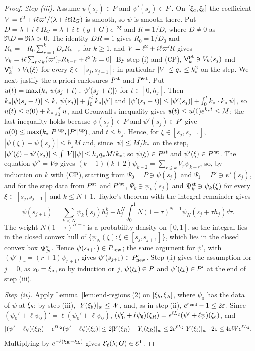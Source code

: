 \begin{proof}
\emph{Step \textup{(iii)}.} Assume $\psi(s_j)\in P$ and $\psi'(s_j)\in P'$. On
$[\xi_a,\xi_b]$ the coefficient $V=\ell^2+i\ell\varpi'/(\lambda+i\ell\Omega_G)$ is smooth, so
$\psi$ is smooth there. Put $D=\lambda+i\ell\Omega_G=\lambda+i\ell(g+G)e^{-2\xi}$ and
$R=1/D$, where $D\ne0$ as $\Re D=\Re\lambda>0$. The identity $DR=1$ gives
$R_0=1/D_0$ and $R_k=-R_0\sum_{r=1}^kD_rR_{k-r}$ for $k\ge1$, and
$V=\ell^2+i\ell\varpi'R$ gives $V_k=i\ell\sum_{r\le k}(\varpi')_rR_{k-r}+\ell^2[k=0]$. By
step (i) and (CP), $\mathsf V^{\rm pt}_k\ni V_k(s_j)$ and
$\mathsf V^{\rm st}_k\ni V_k(\xi)$ for every $\xi\in[s_j,s_{j+1}]$; in particular
$|V|\le q_*\le k_*^2$ on the step. We next justify the a priori enclosures
$P^{\rm st}$ and $P'^{\rm st}$. Put
$u(t)=\max(k_*|\psi(s_j+t)|,|\psi'(s_j+t)|)$ for $t\in[0,h_j]$. Then
$k_*|\psi(s_j+t)|\le k_*|\psi(s_j)|+\int_0^tk_*|\psi'|$ and
$|\psi'(s_j+t)|\le|\psi'(s_j)|+\int_0^tk_*\cdot k_*|\psi|$, so
$u(t)\le u(0)+k_*\int_0^tu$, and Gronwall's inequality gives
$u(t)\le u(0)e^{k_* t}\le M$; the last inequality holds because $\psi(s_j)\in P$
and $\psi'(s_j)\in P'$ give $u(0)\le\max(k_*|P|^{\rm up},|P'|^{\rm up})$, and
$t\le h_j$. Hence, for $\xi\in[s_j,s_{j+1}]$,
$|\psi(\xi)-\psi(s_j)|\le h_jM$ and, since $|\psi|\le M/k_*$ on the step,
$|\psi'(\xi)-\psi'(s_j)|\le\int|V||\psi|\le h_jq_*M/k_*$; so $\psi(\xi)\in P^{\rm st}$
and $\psi'(\xi)\in P'^{\rm st}$. The equation $\psi''=V\psi$ gives
$(k+1)(k+2)\psi_{k+2}=\sum_{r\le k}V_r\psi_{k-r}$, so, by induction on $k$ with
(CP), starting from $\Psi_0=P\ni\psi(s_j)$ and $\Psi_1=P'\ni\psi'(s_j)$, and for the
step data from $P^{\rm st}$ and $P'^{\rm st}$, $\Psi_k\ni\psi_k(s_j)$ and
$\Psi^{\rm st}_k\ni\psi_k(\xi)$ for every $\xi\in[s_j,s_{j+1}]$ and $k\le N+1$.
Taylor's theorem with the integral remainder gives
\[
\psi(s_{j+1})=\sum_{k<N}\psi_k(s_j)h_j^k+h_j^N\int_0^1N(1-\tau)^{N-1}\psi_N(s_j+\tau h_j)\dd\tau .
\]
The weight $N(1-\tau)^{N-1}$ is a probability density on $[0,1]$, so the integral
lies in the closed convex hull of $\{\psi_N(\xi):\xi\in[s_j,s_{j+1}]\}$, which lies in
the closed convex box $\Psi^{\rm st}_N$. Hence $\psi(s_{j+1})\in P_{\rm new}$; the same
argument for $\psi'$, with $(\psi')_r=(r+1)\psi_{r+1}$, gives
$\psi'(s_{j+1})\in P'_{\rm new}$. Step (ii) gives the assumption for $j=0$, as
$s_0=\xi_a$, so by induction on $j$, $\psi(\xi_b)\in P$ and
$\psi'(\xi_b)\in P'$ at the end of step (iii).

\emph{Step \textup{(iv)}.} Apply Lemma~\ref{lem:end-regions}(2) on $[\xi_b,\xi_R]$, where
$\psi_0$ has the data of $\psi$ at $\xi_b$; by step (iii),
$|Y(\xi_b)|_w\le W$, and, as in step (ii), $e^{\varepsilon_{\mathrm{end}}}-1\le2\varepsilon$.
Since $(\psi_0'+\ell\psi_0)'=\ell(\psi_0'+\ell\psi_0)$,
$(\psi_0'+\ell\psi_0)(\xi_R)=e^{\ell L_2}(\psi'+\ell\psi)(\xi_b)$, and
\[
|(\psi'+\ell\psi)(\xi_R)-e^{\ell L_2}(\psi'+\ell\psi)(\xi_b)|\le2|Y(\xi_R)-Y_0(\xi_R)|_w
\le2e^{\ell L_2}|Y(\xi_b)|_w\cdot2\varepsilon\le4\varepsilon We^{\ell L_2}.
\]
Multiplying by $e^{-\ell(\xi_R-\xi_L)}$ gives $\mathcal{E}_\ell(\lambda;G)\in\mathcal{E}^{\rm b}$.
\end{proof}

